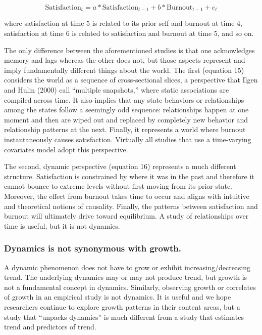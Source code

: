 \documentclass[english,,man]{apa6}
\theoremstyle{definition}
\theoremstyle{definition}
\theoremstyle{definition}
\theoremstyle{remark}
\begin{document}
\begin{equation}
\textrm{Satisfaction}_{t} = a * \textrm{Satisfaction}_{t - 1} + b * \textrm{Burnout}_{t - 1} + e_{t}
\end{equation}

\noindent where satisfaction at time 5 is related to its prior self and
burnout at time 4, satisfaction at time 6 is related to satisfaction and
burnout at time 5, and so on.

The only difference between the aforementioned studies is that one
acknowledges memory and lags whereas the other does not, but those
aspects represent and imply fundamentally different things about the
world. The first (equation 15) considers the world as a sequence of
cross-sectional slices, a perspective that Ilgen and Hulin (2000) call
\enquote{multiple snapshots,} where static associations are compiled
across time. It also implies that any state behaviors or relationships
among the states follow a seemingly odd sequence: relationships happen
at one moment and then are wiped out and replaced by completely new
behavior and relationship patterns at the next. Finally, it represents a
world where burnout instantaneously causes satisfaction. Virtually all
studies that use a time-varying covariates model adopt this perspective.

The second, dynamic perspective (equation 16) represents a much
different structure. Satisfaction is constrained by where it was in the
past and therefore it cannot bounce to extreme levels without first
moving from its prior state. Moreover, the effect from burnout takes
time to occur and aligns with intuitive and theoretical notions of
causality. Finally, the patterns between satisfaction and burnout will
ultimately drive toward equilibrium. A study of relationships over time
is useful, but it is not dynamics.

\hypertarget{dynamics-is-not-synonymous-with-growth.}{%
\subsubsection{Dynamics is not synonymous with
growth.}\label{dynamics-is-not-synonymous-with-growth.}}

A dynamic phenomenon does not have to grow or exhibit
increasing/decreasing trend. The underlying dynamics may or may not
produce trend, but growth is not a fundamental concept in dynamics.
Similarly, observing growth or correlates of growth in an empirical
study is not dynamics. It is useful and we hope researchers continue to
explore growth patterns in their content areas, but a study that
\enquote{unpacks dynamics} is much different from a study that estimates
trend and predictors of trend.
\end{document}
